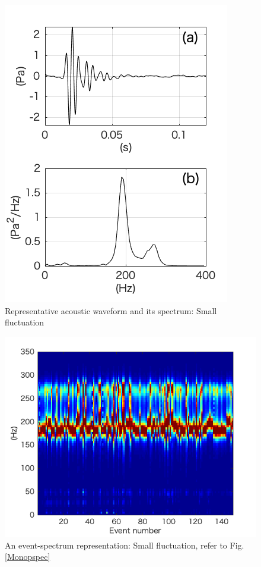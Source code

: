 \documentclass[12pt]{article}
\begin{document}
\begin{figure}[H]
\begin{center}
\includegraphics[scale=1] {Flctwaveform.png} 
\caption{Representative acoustic waveform and its spectrum: Small fluctuation}
\label{Flctwaveform}
\end{center}
\end{figure} 

\begin{figure}[H]
\begin{center}
\includegraphics[scale=1] {Flctpspec.png} 
\caption{An event-spectrum representation: Small fluctuation, refer to Fig. \ref{Monopspec}}
\label{Flctpspec}
\end{center}
\end{figure} 
\end{document}
